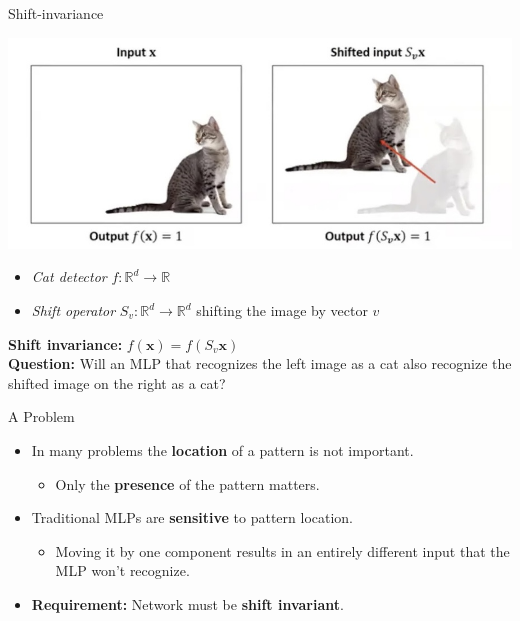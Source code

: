 \documentclass[default, aspectratio=169]{beamer}
\begin{document}
	\begin{frame}{Shift-invariance}
		\begin{center}
			\includegraphics[keepaspectratio, scale=0.25]{pic/shift_invariance.jpg}
		\end{center}
		
		\begin{itemize}
			\item \textit{Cat detector} \quad $f: \mathbb{R}^d \to \mathbb{R}$
			
			\item \textit{Shift operator} \quad $S_v: \mathbb{R}^d \to \mathbb{R}^d$ \quad shifting the image by vector $v$
		\end{itemize}
		
		\textbf{Shift invariance:} \quad $f(\mathbf{x}) = f(S_v \mathbf{x})$
		\\ \textbf{Question: }{Will an MLP that recognizes the left image as a cat also recognize the shifted image on the right as a cat?}
	\end{frame}
	\begin{frame}{A Problem}
		\begin{itemize}
			\item In many problems the \textbf{location} of a pattern is not important.
			\begin{itemize}
				\item Only the \textbf{presence} of the pattern matters.
			\end{itemize}
			\item Traditional MLPs are \textbf{sensitive} to pattern location.
			\begin{itemize}
				\item Moving it by one component results in an entirely different input that the MLP won’t recognize.
			\end{itemize}
			
			\item \textbf{Requirement:} Network must be \textbf{shift invariant}.
		\end{itemize}
	\end{frame}
\end{document}
